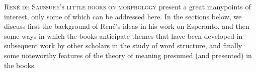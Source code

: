 \label{ch.commentary}

\lettrine[loversize=0.1, nindent=0.5em]{R}{en\'e de Saussure's little books on morphology} 
present a great many\linebreak points of interest, only
some of which can be addressed here. In the sections below, we discuss
first the background of René's ideas in his work on Esperanto, and
then some ways in which the books anticipate themes that have been
developed in subsequent work by other scholars in the study of word
structure, and finally some noteworthy features of the theory of
meaning presumed (and presented) in the books.

\newpage
